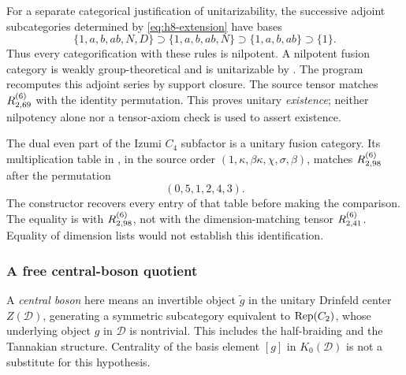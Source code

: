 For a separate categorical justification of unitarizability, the
successive adjoint subcategories determined by
\eqref{eq:h8-extension} have bases
\[
 \{1,a,b,ab,N,D\}\supset\{1,a,b,ab,N\}
 \supset\{1,a,b,ab\}\supset\{1\}.
\]
Thus every categorification with these rules is nilpotent. A nilpotent
fusion category is weakly group-theoretical and is unitarizable by
\cite[Theorem~5.20]{GHR}. The program recomputes this adjoint series by
support closure. The source tensor matches $R^{(6)}_{2,69}$ with the identity
permutation. This proves unitary \emph{existence}; neither nilpotency
alone nor a tensor-axiom check is used to assert existence.

The dual even part of the Izumi $C_4$ subfactor is a unitary fusion
category. Its multiplication table in \cite[p.~27]{IMP}, in the source
order $(1,\kappa,\beta\kappa,\chi,\sigma,\beta)$, matches
$R^{(6)}_{2,98}$ after the permutation
\[
 (0,5,1,2,4,3).
\]
The constructor recovers every entry of that table before making the
comparison. The equality is with $R^{(6)}_{2,98}$, not with the
dimension-matching tensor $R^{(6)}_{2,41}$. Equality of dimension lists
would not establish this identification.

\subsubsection{A free central-boson quotient}
A \emph{central boson} here means an invertible object $\widetilde g$ in
the unitary Drinfeld center $Z(\mathcal D)$, generating a symmetric
subcategory equivalent to $\operatorname{Rep}(C_2)$, whose underlying object $g$ in
$\mathcal D$ is nontrivial. This includes the half-braiding and the
Tannakian structure. Centrality of the basis element $[g]$ in
$K_0(\mathcal D)$ is not a substitute for this hypothesis.

